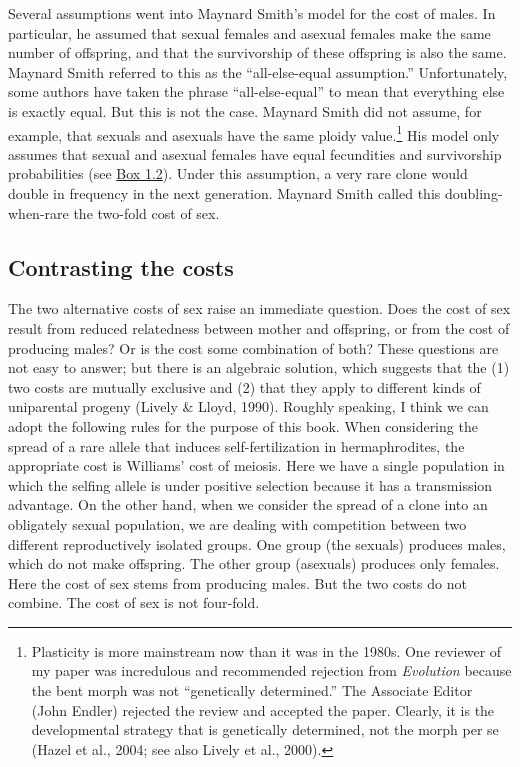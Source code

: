\documentclass[
  letterpaper,
]{book}
\begin{document}
Several assumptions went into Maynard Smith's model for the cost of
males. In particular, he assumed that sexual females and asexual females
make the same number of offspring, and that the survivorship of these
offspring is also the same. Maynard Smith referred to this as the
``all-else-equal assumption.'' Unfortunately, some authors have taken
the phrase ``all-else-equal'' to mean that everything else is exactly
equal. But this is not the case. Maynard Smith did not assume, for
example, that sexuals and asexuals have the same ploidy
value.\footnote{Plasticity is more mainstream now than it was in the
  1980s. One reviewer of my paper was incredulous and recommended
  rejection from \emph{Evolution} because the bent morph was not
  ``genetically determined.'' The Associate Editor (John Endler)
  rejected the review and accepted the paper. Clearly, it is the
  developmental strategy that is genetically determined, not the morph
  per se (Hazel et al., 2004; see also Lively et al., 2000).} His model
only assumes that sexual and asexual females have equal fecundities and
survivorship probabilities (see \protect\hyperlink{callout-2}{Box 1.2}).
Under this assumption, a very rare clone would double in frequency in
the next generation. Maynard Smith called this doubling-when-rare the
two-fold cost of sex.

\hypertarget{contrasting-the-costs}{%
\subsection{Contrasting the costs}\label{contrasting-the-costs}}

The two alternative costs of sex raise an immediate question. Does the
cost of sex result from reduced relatedness between mother and
offspring, or from the cost of producing males? Or is the cost some
combination of both? These questions are not easy to answer; but there
is an algebraic solution, which suggests that the (1) two costs are
mutually exclusive and (2) that they apply to different kinds of
uniparental progeny (Lively \& Lloyd, 1990). Roughly speaking, I think
we can adopt the following rules for the purpose of this book. When
considering the spread of a rare allele that induces self-fertilization
in hermaphrodites, the appropriate cost is Williams' cost of meiosis.
Here we have a single population in which the selfing allele is under
positive selection because it has a transmission advantage. On the other
hand, when we consider the spread of a clone into an obligately sexual
population, we are dealing with competition between two different
reproductively isolated groups. One group (the sexuals) produces males,
which do not make offspring. The other group (asexuals) produces only
females. Here the cost of sex stems from producing males. But the two
costs do not combine. The cost of sex is not four-fold.
\end{document}
